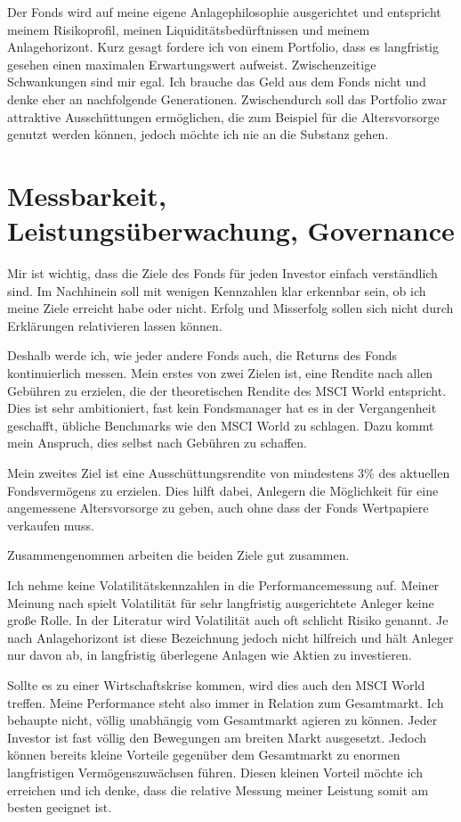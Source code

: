 \documentclass{article}
\begin{document}
Der Fonds wird auf meine eigene Anlagephilosophie ausgerichtet und entspricht meinem Risikoprofil, meinen Liquiditätsbedürftnissen und meinem Anlagehorizont. Kurz gesagt fordere ich von einem Portfolio, dass es langfristig gesehen einen maximalen Erwartungswert aufweist. Zwischenzeitige Schwankungen sind mir egal. Ich brauche das Geld aus dem Fonds nicht und denke eher an nachfolgende Generationen. Zwischendurch soll das Portfolio zwar attraktive Ausschüttungen ermöglichen, die zum Beispiel für die Altersvorsorge genutzt werden können, jedoch möchte ich nie an die Substanz gehen.

\section{Messbarkeit, Leistungsüberwachung, Governance}

Mir ist wichtig, dass die Ziele des Fonds für jeden Investor einfach verständlich sind. Im Nachhinein soll mit wenigen Kennzahlen klar erkennbar sein, ob ich meine Ziele erreicht habe oder nicht. Erfolg und Misserfolg sollen sich nicht durch Erklärungen relativieren lassen können.

Deshalb werde ich, wie jeder andere Fonds auch, die Returns des Fonds kontinuierlich messen. Mein erstes von zwei Zielen ist, eine Rendite nach allen Gebühren zu erzielen, die der theoretischen Rendite des MSCI World entspricht. Dies ist sehr ambitioniert, fast kein Fondsmanager hat es in der Vergangenheit geschafft, übliche Benchmarks wie den MSCI World zu schlagen. Dazu kommt mein Anspruch, dies selbst nach Gebühren zu schaffen.

Mein zweites Ziel ist eine Ausschüttungsrendite von mindestens 3\% des aktuellen Fondsvermögens zu erzielen. Dies hilft dabei, Anlegern die Möglichkeit für eine angemessene Altersvorsorge zu geben, auch ohne dass der Fonds Wertpapiere verkaufen muss.

Zusammengenommen arbeiten die beiden Ziele gut zusammen.

Ich nehme keine Volatilitätskennzahlen in die Performancemessung auf. Meiner Meinung nach spielt Volatilität für sehr langfristig ausgerichtete Anleger keine große Rolle. In der Literatur wird Volatilität auch oft schlicht Risiko genannt. Je nach Anlagehorizont ist diese Bezeichnung jedoch nicht hilfreich und hält Anleger nur davon ab, in langfristig überlegene Anlagen wie Aktien zu investieren.

Sollte es zu einer Wirtschaftskrise kommen, wird dies auch den MSCI World treffen. Meine Performance steht also immer in Relation zum Gesamtmarkt. Ich behaupte nicht, völlig unabhängig vom Gesamtmarkt agieren zu können. Jeder Investor ist fast völlig den Bewegungen am breiten Markt ausgesetzt. Jedoch können bereits kleine Vorteile gegenüber dem Gesamtmarkt zu enormen langfristigen Vermögenszuwächsen führen. Diesen kleinen Vorteil möchte ich erreichen und ich denke, dass die relative Messung meiner Leistung somit am besten geeignet ist.
\end{document}

